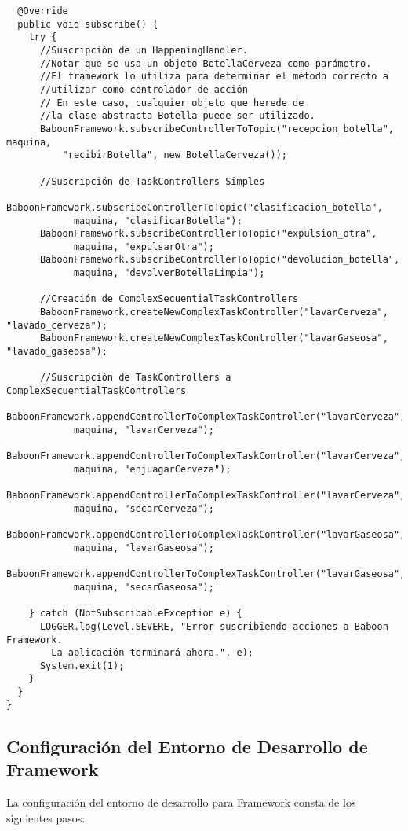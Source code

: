 \begin{verbatim}
  @Override
  public void subscribe() {
    try {
      //Suscripción de un HappeningHandler.
      //Notar que se usa un objeto BotellaCerveza como parámetro.
      //El framework lo utiliza para determinar el método correcto a
      //utilizar como controlador de acción
      // En este caso, cualquier objeto que herede de
      //la clase abstracta Botella puede ser utilizado.
      BaboonFramework.subscribeControllerToTopic("recepcion_botella", maquina,
          "recibirBotella", new BotellaCerveza());

      //Suscripción de TaskControllers Simples
      BaboonFramework.subscribeControllerToTopic("clasificacion_botella", 
            maquina, "clasificarBotella");
      BaboonFramework.subscribeControllerToTopic("expulsion_otra", 
            maquina, "expulsarOtra");
      BaboonFramework.subscribeControllerToTopic("devolucion_botella", 
            maquina, "devolverBotellaLimpia");

      //Creación de ComplexSecuentialTaskControllers
      BaboonFramework.createNewComplexTaskController("lavarCerveza", "lavado_cerveza");
      BaboonFramework.createNewComplexTaskController("lavarGaseosa", "lavado_gaseosa");

      //Suscripción de TaskControllers a ComplexSecuentialTaskControllers
      BaboonFramework.appendControllerToComplexTaskController("lavarCerveza", 
            maquina, "lavarCerveza");
      BaboonFramework.appendControllerToComplexTaskController("lavarCerveza", 
            maquina, "enjuagarCerveza");
      BaboonFramework.appendControllerToComplexTaskController("lavarCerveza", 
            maquina, "secarCerveza");
      BaboonFramework.appendControllerToComplexTaskController("lavarGaseosa", 
            maquina, "lavarGaseosa");
      BaboonFramework.appendControllerToComplexTaskController("lavarGaseosa",
            maquina, "secarGaseosa");

    } catch (NotSubscribableException e) {
      LOGGER.log(Level.SEVERE, "Error suscribiendo acciones a Baboon Framework.
        La aplicación terminará ahora.", e);
      System.exit(1);
    }
  }
}
\end{verbatim}

\subsection {Configuración del Entorno de Desarrollo de \nombreFramework
Framework}

La configuración del entorno de desarrollo para \nombreFramework
Framework consta de los siguientes pasos:

